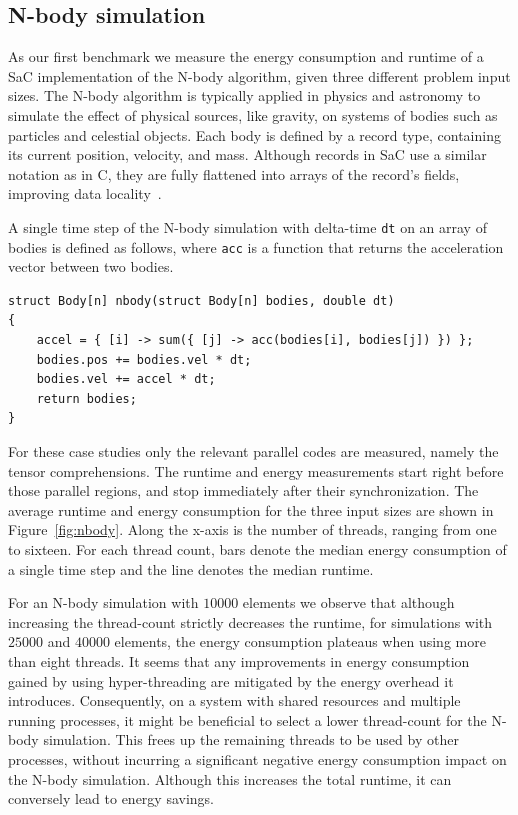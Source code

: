 \documentclass[runningheads]{llncs}
\begin{document}
\subsection{N-body simulation}
As our first benchmark we measure the energy consumption and runtime of a SaC implementation of the N-body algorithm, given three different problem input sizes.
The N-body algorithm is typically applied in physics and astronomy to simulate the effect of physical sources, like gravity, on systems of bodies such as particles and celestial objects.
Each body is defined by a record type, containing its current position, velocity, and mass.
Although records in SaC use a similar notation as in C, they are fully flattened into arrays of the record's fields, improving data locality~\cite{huijben2025flattening}.

A single time step of the N-body simulation with delta-time \texttt{dt} on an array of bodies is defined as follows, where \texttt{acc} is a function that returns the acceleration vector between two bodies.
\begin{verbatim}
struct Body[n] nbody(struct Body[n] bodies, double dt)
{
    accel = { [i] -> sum({ [j] -> acc(bodies[i], bodies[j]) }) };
    bodies.pos += bodies.vel * dt;
    bodies.vel += accel * dt;
    return bodies;
}
\end{verbatim}

For these case studies only the relevant parallel codes are measured, namely the tensor comprehensions.
The runtime and energy measurements start right before those parallel regions, and stop immediately after their synchronization.
The average runtime and energy consumption for the three input sizes are shown in Figure~\ref{fig:nbody}.
Along the x-axis is the number of threads, ranging from one to sixteen.
For each thread count, bars denote the median energy consumption of a single time step and the line denotes the median runtime.

For an N-body simulation with $10000$ elements we observe that although increasing the thread-count strictly decreases the runtime, for simulations with $25000$ and $40000$ elements, the energy consumption plateaus when using more than eight threads.
It seems that any improvements in energy consumption gained by using hyper-threading are mitigated by the energy overhead it introduces.
Consequently, on a system with shared resources and multiple running processes, it might be beneficial to select a lower thread-count for the N-body simulation.
This frees up the remaining threads to be used by other processes, without incurring a significant negative energy consumption impact on the N-body simulation.
Although this increases the total runtime, it can conversely lead to energy savings.
\end{document}
